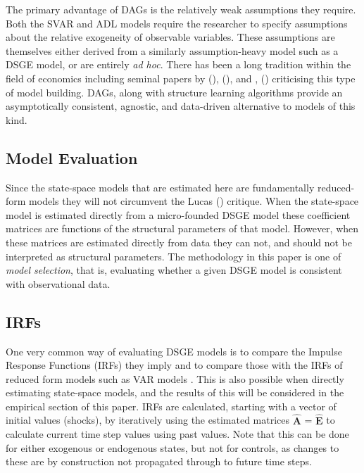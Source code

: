 \documentclass{article}
\begin{document}
The primary advantage of DAGs is the relatively weak assumptions they require. Both the SVAR and ADL models require the researcher to specify assumptions about the relative exogeneity of observable variables. These assumptions are themselves either derived from a similarly assumption-heavy model such as a DSGE model, or are entirely \textit{ad hoc}. There has been a long tradition within the field of economics including seminal papers by \citeauthor{lucas1976econometric} (\citeyear{lucas1976econometric}), \citeauthor{sims1980macroeconomics} (\citeyear{sims1980macroeconomics}), and \citeauthor{jorda2005estimation}, (\citeyear{jorda2005estimation}) criticising this type of model building. DAGs, along with structure learning algorithms provide an asymptotically consistent, agnostic, and data-driven alternative to models of this kind.

\subsection{Model Evaluation}

Since the state-space models that are estimated here are fundamentally reduced-form models they will not circumvent the Lucas (\citeyear{lucas1976econometric}) critique. When the state-space model is estimated directly from a micro-founded DSGE model these coefficient matrices are functions of the structural parameters of that model. However, when these matrices are estimated directly from data they can not, and should not be interpreted as structural parameters. The methodology in this paper is one of \textit{model selection}, that is, evaluating whether a given DSGE model is consistent with observational data. 

\subsection{IRFs}

One very common way of evaluating DSGE models is to compare the Impulse Response Functions (IRFs) they imply and to compare those with the IRFs of reduced form models such as VAR models \parencite[p.83]{ramey2016handbook}. This is also possible when directly estimating state-space models, and the results of this will be considered in the empirical section of this paper. IRFs are calculated, starting with a vector of initial values (shocks), by iteratively using the estimated matrices $\hat{\mathbf{A}}$ = $\hat{\mathbf{E}}$ to calculate current time step values using past values. Note that this can be done for either exogenous or endogenous states, but not for controls, as changes to these are by construction not propagated through to future time steps.
\end{document}
